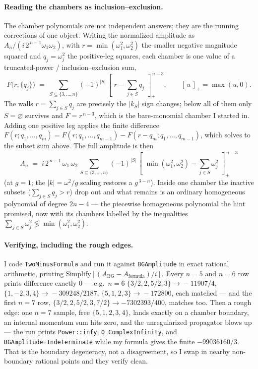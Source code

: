 \documentclass{article}
\newcommand{\pp}[1]{\left[\,#1\,\right]_{+}}
\begin{document}
\paragraph{Reading the chambers as inclusion--exclusion.}
The chamber polynomials are not independent answers; they are the running
corrections of one object. Writing the normalized amplitude as
$A_n/(i\,2^{\,n-1}\omega_1\omega_2)$, with $r=\min(\omega_1^2,\omega_2^2)$ the
smaller negative magnitude squared and $q_j=\omega_j^2$ the positive-leg squares,
each chamber is one value of a truncated-power / inclusion--exclusion sum,
\[
F\big(r;\{q_j\}\big)\;=\;\sum_{S\subseteq\{3,\dots,n\}}(-1)^{|S|}\,
\pp{\,r-\textstyle\sum_{j\in S}q_j\,}^{\,n-3},
\qquad \pp{u}=\max(u,0).
\]
The walls $r=\sum_{j\in S}q_j$ are precisely the $|k_S|$ sign changes; below all
of them only $S=\varnothing$ survives and $F=r^{\,n-3}$, which is the bare-monomial
chamber I started in. Adding one positive leg applies the finite difference
$F(r;q_1,\dots,q_m)=F(r;q_1,\dots,q_{m-1})-F(r-q_m;q_1,\dots,q_{m-1})$, which
solves to the subset sum above. The full amplitude is then
\[
\boxed{\;
A_n \;=\; i\,2^{\,n-1}\,\omega_1\,\omega_2\,
\sum_{S\subseteq\{3,\dots,n\}}(-1)^{|S|}\,
\pp{\,\min(\omega_1^2,\omega_2^2)-\textstyle\sum_{j\in S}\omega_j^2\,}^{\,n-3}\;}
\]
(at $g=1$; the $|k|=\omega^2/g$ scaling restores a $g^{\,3-n}$). Inside one
chamber the inactive subsets ($\sum_{j\in S}q_j>r$) drop out and what remains is
an ordinary homogeneous polynomial of degree $2n-4$ --- the piecewise homogeneous
polynomial the hint promised, now with its chambers labelled by the inequalities
$\sum_{j\in S}\omega_j^2 \lessgtr \min(\omega_1^2,\omega_2^2)$.

\paragraph{Verifying, including the rough edges.}
I code \texttt{TwoMinusFormula} and run it against \texttt{BGAmplitude} in exact
rational arithmetic, printing $\mathrm{Simplify}[(A_{\mathrm{BG}}-A_{\mathrm{formula}})/i]$.
Every $n=5$ and $n=6$ row prints difference exactly $0$ --- e.g.\ $n=6$
$\{3/2,2,5/2,3\}\!\to\!-11907/4$, $\{1,-2,3,4\}\!\to\!-309248/2187$,
$\{5,1,2,3\}\!\to\!-172800$, each matched --- and the first $n=7$ row,
$\{3/2,2,5/2,3,7/2\}\to-7302393/400$, matches too. Then a rough edge: one $n=7$
sample, free $\{5,1,2,3,4\}$, lands exactly on a chamber boundary, an internal
momentum sum hits zero, and the unregularized propagator blows up --- the run
prints \texttt{Power::infy}, \texttt{0\,ComplexInfinity}, and
\texttt{BGAmplitude=Indeterminate} while my formula gives the finite
$-99036160/3$. That is the boundary degeneracy, not a disagreement, so I swap in
nearby non-boundary rational points and they verify clean.
\end{document}
